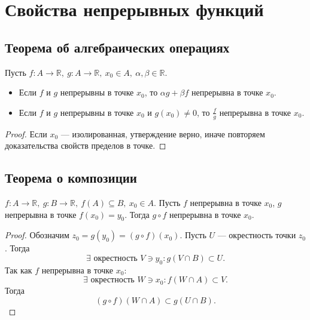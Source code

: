 \documentclass[11pt]{book}
\newcommand{\R}{\mathbb{R}}
\theoremstyle{definition}
\theoremstyle{plain}
\theoremstyle{plain}
\theoremstyle{definition}
\theoremstyle{remark}
\begin{document}
\section{Свойства непрерывных функций}
\subsection{Теорема об алгебраических операциях}
\begin{thm}
    Пусть $ f: A \to  \R, ~ g : A \to \R, ~ x_0 \in A, ~ \alpha , \beta \in \R$.
    \begin{itemize}
	\item Если $ f$ и  $ g$ непрерывны в точке  $ x_0$, то $ \alpha g + \beta f$ непрерывна в точке $ x_0$.
	\item     Если $ f$ и  $ g$ непрерывны в точке  $ x_0$ и $ g(x_0) \ne 0$, то $\frac{f}{g}$ непрерывна в точке $ x_0$.
    \end{itemize}
\end{thm}
\begin{proof}
    Если $ x_0$ --- изолированная, утверждение верно, иначе повторяем доказательства свойств пределов в точке.
\end{proof}
\subsection{Теорема о композиции}
\begin{thm}[о композиции]
    $ f: A \to  \R, ~ g: B \to  \R, ~ f(A) \subseteq B, ~ x_0 \in A$. Пусть $ f$ непрерывна в точке $ x_0$, $ g$ непрерывна в точке  $ f(x_0) = y_0$.
    Тогда $ g\circ f$ непрерывна в точке $ x_0$.
\end{thm}
\begin{proof}
    Обозначим $ z_0 = g(y_0) = (g \circ f)(x_0)$.
    Пусть $ U$ --- окрестность точки $ z_0$. Тогда
    \[
	\exists \text{ окрестность }   V \ni y_0: g(V \cap B) \subset U
    .\]
    Так как $ f$ непрерывна в точке  $ x_0$:
    \[
	\exists  \text{ окрестность }  W \ni x_0: f(W \cap A) \subset  V
    .\]
    Тогда \[
	(g \circ f)(W \cap A) \subset g(U \cap B)
    .\]
\end{proof}
\end{document}
